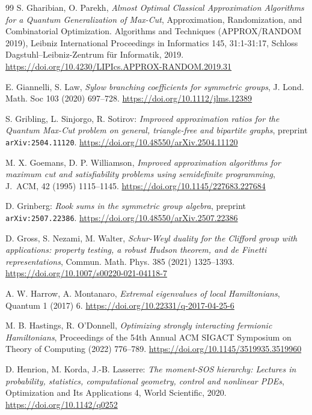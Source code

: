 \documentclass[12pt,dvipsnames,accepted=2016-08-18,a4paper,onecolumn]{quantumarticle}
\numberwithin{equation}{section}
\theoremstyle{definition}
\begin{document}
\begin{thebibliography}{99}
S. Gharibian, O. Parekh, \textit{Almost Optimal Classical Approximation Algorithms for a Quantum Generalization of Max-Cut}, 
Approximation, Randomization, and Combinatorial Optimization. Algorithms and Techniques (APPROX/RANDOM 2019), 
Leibniz International Proceedings in Informatics 145, 31:1-31:17, Schloss Dagstuhl–Leibniz-Zentrum f\"ur Informatik, 2019. \url{https://doi.org/10.4230/LIPIcs.APPROX-RANDOM.2019.31}


E. Giannelli, S. Law, \emph{Sylow branching coefficients for symmetric groups}, 
J. Lond. Math. Soc 103 (2020) 697--728. \url{https://doi.org/10.1112/jlms.12389}

S. Gribling, L. Sinjorgo, R. Sotirov:
\textit{Improved approximation ratios for the Quantum Max-Cut problem on general, triangle-free and bipartite graphs}, 
preprint \texttt{arXiv:2504.11120}. \url{https://doi.org/10.48550/arXiv.2504.11120}

M. X. Goemans, D. P. Williamson, \textit{Improved approximation algorithms
 for maximum cut and satisfiability problems using semidefinite programming},
 J.~ACM, 42 (1995) 1115--1145. \url{https://doi.org/10.1145/227683.227684}

D. Grinberg:
\textit{Rook sums in the symmetric group algebra},  preprint \texttt{arXiv:2507.22386}.
\url{https://doi.org/10.48550/arXiv.2507.22386}

D. Gross, S. Nezami, M. Walter,
\textit{Schur-Weyl duality for the Clifford group with applications: property testing, a robust Hudson theorem, and de Finetti representations},
Commun. Math. Phys. 385 (2021) 1325--1393. \url{https://doi.org/10.1007/s00220-021-04118-7}

A. W. Harrow, A. Montanaro, \textit{Extremal eigenvalues of local
 Hamiltonians}, Quantum 1 (2017) 6. \url{https://doi.org/10.22331/q-2017-04-25-6}

  M. B. Hastings, R. O’Donnell, \textit{Optimizing strongly interacting
 fermionic Hamiltonians}, Proceedings of the 54th Annual ACM SIGACT Symposium on Theory of Computing  (2022) 776--789. \url{https://doi.org/10.1145/3519935.3519960}

D. Henrion, M. Korda, J.-B. Lasserre: 
\textit{The moment-SOS hierarchy: Lectures in probability, statistics, computational geometry, control and nonlinear PDEs}, Optimization and Its Applications 4, World Scientific, 2020. \url{https://doi.org/10.1142/q0252}


\end{thebibliography}
\end{document}
